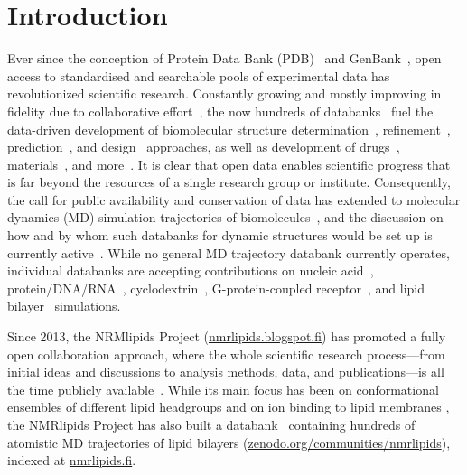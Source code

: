 \documentclass[journal=jcisd8,manuscript=article,layout=twocolumn]{achemso}
\begin{document}
\section{Introduction}
Ever since the conception of Protein Data Bank (PDB)~\cite{nnb1971,wwPDB2019} and GenBank~\cite{jordan1982,sayers2020},
open access to standardised and searchable pools of experimental data has
revolutionized
scientific
research. %
Constantly growing and mostly improving in fidelity
due to collaborative effort~\cite{levitt2007,Brzezinski:2020a,Harris:2003a,Steinegger:2020a}, %
the now hundreds of databanks~\cite{Rigden:2020a}
fuel the data-driven development of
biomolecular structure determination~\cite{Simpkin:2019a},
refinement~\cite{Leelananda:2020a}, %
prediction~\cite{Senior:2020a}, and
design~\cite{huang2016} approaches,
as well as development of
drugs~\cite{Westbrook:2019a,Martinez-Mayorga:2020a}, %
materials~\cite{Senderowitz:2018a,Wan:2019a},
and more~\cite{Perez-Riverol:2019a,Feng:2020a}.
It is clear that open data enables scientific
progress that is far beyond the resources of a single research group or institute.
%
Consequently,
the call for public availability and conservation of data has extended to molecular dynamics (MD) simulation trajectories of biomolecules~\cite{Feig:1999a,Tai:2004a,Silva:2006a}, and the discussion on how and by whom such databanks for dynamic structures would be set up is currently active~\cite{Hildebrand:2019a,Abraham:2019a,Abriata:2020a,Hospital:2020a}.
%
While no general MD trajectory databank %
currently operates,
individual databanks are accepting contributions on
nucleic acid~\cite{Hospital:2016a}, %
protein/DNA/RNA~\cite{Bekker:2020a}, %
cyclodextrin~\cite{Mixcoha:2016a}, %
G-protein-coupled receptor~\cite{Rodriguez-Espigares:2019a}, %
and lipid bilayer~\cite{Miettinen:2019c} %
simulations.

Since 2013, the NRMlipids Project (\url{nmrlipids.blogspot.fi}) has
promoted a fully open collaboration approach, where
the whole scientific research process---from initial ideas and discussions to
analysis methods, data, and publications---is all the time publicly available~\cite{botan15}.
While its main focus has been on conformational ensembles
of different lipid headgroups and on ion binding to lipid membranes \cite{botan15,catte16,Antila:2019a},
the NMR\-lipids Project has also built a databank~\cite{Miettinen:2019c} containing hundreds
of atomistic MD trajectories of lipid bilayers  (\url{zenodo.org/communities/nmrlipids}),
indexed at \url{nmrlipids.fi}.
\end{document}

